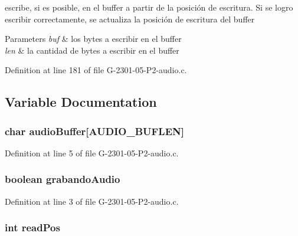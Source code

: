 escribe, si es posible, en el buffer a partir de la posición de escritura. Si se logro escribir correctamente, se actualiza la posición de escritura del buffer 


\begin{DoxyParams}{Parameters}
{\em buf} & los bytes a escribir en el buffer \\
\hline
{\em len} & la cantidad de bytes a escribir en el buffer \\
\hline
\end{DoxyParams}


Definition at line 181 of file G-\/2301-\/05-\/\-P2-\/audio.\-c.



\subsection{Variable Documentation}
\hypertarget{_g-2301-05-_p2-audio_8c_a5910b24e625d530fb8ff50b0dcef805a}{
\subsubsection[{audio\-Buffer}]{\setlength{\rightskip}{0pt plus 5cm}char audio\-Buffer\mbox{[}{\bf A\-U\-D\-I\-O\-\_\-\-B\-U\-F\-L\-E\-N}\mbox{]}}}\label{_g-2301-05-_p2-audio_8c_a5910b24e625d530fb8ff50b0dcef805a}


Definition at line 5 of file G-\/2301-\/05-\/\-P2-\/audio.\-c.

\hypertarget{_g-2301-05-_p2-audio_8c_a991a654ebc130040f9ca67c7a4c1956d}{
\subsubsection[{grabando\-Audio}]{\setlength{\rightskip}{0pt plus 5cm}boolean grabando\-Audio}}\label{_g-2301-05-_p2-audio_8c_a991a654ebc130040f9ca67c7a4c1956d}


Definition at line 3 of file G-\/2301-\/05-\/\-P2-\/audio.\-c.

\hypertarget{_g-2301-05-_p2-audio_8c_ae80c1a9f4c0091ea6d461132b9457a4c}{
\subsubsection[{read\-Pos}]{\setlength{\rightskip}{0pt plus 5cm}int read\-Pos}}\label{_g-2301-05-_p2-audio_8c_ae80c1a9f4c0091ea6d461132b9457a4c}


